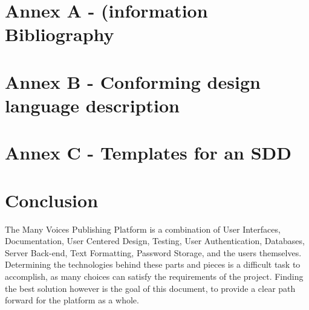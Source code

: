 \documentclass[letterpaper, 10pt, draftclsnofoot, compsoc, onecolumn]{IEEEtran}
\begin{document}
\vspace{1pc}
\section{Annex A - (information Bibliography}
\vspace{1pc}


%


\vspace{1pc}
\section{Annex B - Conforming design language description}
\vspace{1pc}
{\noindent \par}

\vspace{1pc}
\section{Annex C - Templates for an SDD}
\vspace{1pc}
{\noindent \par}


\newpage
\section{Conclusion}
{\noindent  The Many Voices Publishing Platform is a combination of User Interfaces, Documentation, User Centered Design, Testing, User Authentication, Databases, Server Back-end, Text Formatting, Password Storage, and the users themselves. Determining the technologies behind these parts and pieces is a difficult task to accomplish, as many choices can satisfy the requirements of the project. Finding the best solution however is the goal of this document, to provide a clear path forward for the platform as a whole. \par}

%
%
\end{document}
